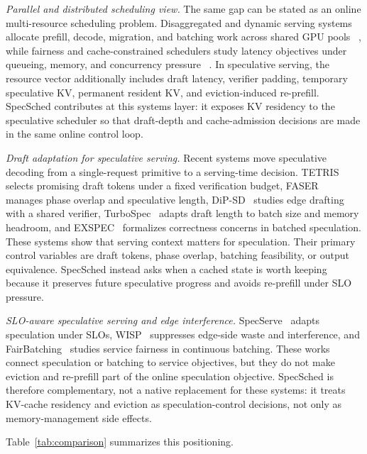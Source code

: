 \documentclass[journal]{IEEEtran}
\newcommand{\system}{SpecSched}
\begin{document}
\textit{Parallel and distributed scheduling view.}
The same gap can be stated as an online multi-resource scheduling
problem. Disaggregated and dynamic serving systems allocate prefill,
decode, migration, and batching work across shared GPU pools
~\cite{zhong2024distserve,patel2024splitwise,agrawal2024taming,
sun2024llumnix}, while fairness and cache-constrained schedulers study
latency objectives under queueing, memory, and concurrency pressure
~\cite{sheng2024fairness,jaillet2025kvsched,chen2026concur}. In
speculative serving, the resource vector additionally includes draft
latency, verifier padding, temporary speculative KV, permanent resident
KV, and eviction-induced re-prefill. \system{} contributes at this
systems layer: it exposes KV residency to the speculative scheduler so
that draft-depth and cache-admission decisions are made in the same
online control loop.

\textit{Draft adaptation for speculative serving.}
Recent systems move speculative decoding from a single-request primitive
to a serving-time decision. TETRIS~\cite{wu2025tetris} selects
promising draft tokens under a fixed verification budget,
FASER~\cite{chen2026faser} manages phase overlap and speculative
length, DiP-SD~\cite{xu2026dipsd} studies edge drafting with a shared
verifier, TurboSpec~\cite{liu2024turbospec} adapts draft length to
batch size and memory headroom, and EXSPEC~\cite{zhang2025batchspec}
formalizes correctness concerns in batched speculation. These systems
show that serving context matters for speculation. Their primary
control variables are draft tokens, phase overlap, batching feasibility,
or output equivalence. \system{} instead asks when a cached state is
worth keeping because it preserves future speculative progress and
avoids re-prefill under SLO pressure.

\textit{SLO-aware speculative serving and edge interference.}
SpecServe~\cite{huang2025specserve} adapts speculation under SLOs,
WISP~\cite{li2026wisp} suppresses edge-side waste and interference, and
FairBatching~\cite{lyu2025fairbatching} studies service fairness in
continuous batching. These works connect speculation or batching to
service objectives, but they do not make eviction and re-prefill part of
the online speculation objective. \system{} is therefore complementary,
not a native replacement for these systems: it treats KV-cache residency
and eviction as speculation-control decisions, not only as
memory-management side effects.

Table~\ref{tab:comparison} summarizes this positioning.
\end{document}
